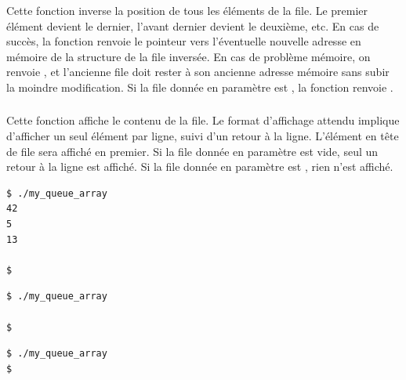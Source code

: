\subsubsection*{}

\noindent Cette fonction inverse la position de tous les éléments de la file.
Le premier élément devient le dernier, l'avant dernier devient le deuxième, etc.
En cas de succès, la fonction renvoie le pointeur vers l'éventuelle nouvelle adresse en mémoire de la structure de la file inversée.
En cas de problème mémoire, on renvoie , et l'ancienne file doit rester à son ancienne adresse mémoire sans subir la moindre modification.
Si la file donnée en paramètre est , la fonction renvoie .


\subsubsection*{}

\noindent Cette fonction affiche le contenu de la file.
Le format d'affichage attendu implique d'afficher un seul élément par ligne, suivi d'un retour à la ligne.
L'élément en tête de file sera affiché en premier.
Si la file donnée en paramètre est vide, seul un retour à la ligne est affiché.
Si la file donnée en paramètre est , rien n'est affiché.

\bigskip

\lstset{language=sh}
\begin{lstlisting}[frame=single,title={Exemple d'affichage du cas normal : file contenant 42, 5, 13}]
$ ./my_queue_array
42
5
13

$
\end{lstlisting}

\bigskip

\lstset{language=sh}
\begin{lstlisting}[frame=single,title={Exemple d'affichage d'une file vide}]
$ ./my_queue_array

$
\end{lstlisting}

\bigskip

\lstset{language=sh}
\begin{lstlisting}[frame=single,title={Exemple d'affichage d'un pointeur NULL}]
$ ./my_queue_array
$
\end{lstlisting}